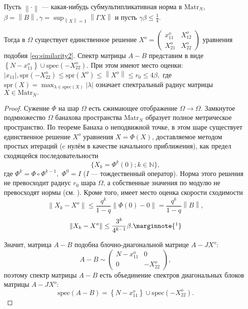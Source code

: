 \begin{lemma}
    Пусть \( {\left\|\cdot\right\|} \) --- какая-нибудь субмультипликативная норма в \( \mathrm{Matr}_{N} \),
    \( \beta={\left\|B\right\|}, \gamma=\sup_{{\left\|X\right\|}=1}{\left\|\Gamma X\right\|} \)
    и пусть
    \( \gamma\beta\leq\frac14. \)

    Тогда в \( \Omega \) существует единственное решение
    \( X^o = \begin{pmatrix}
        x_{11}^o & X_{12}^o \\
        X_{21}^o & X_{22}^o
    \end{pmatrix}\) уравнения подобия
    \eqref{eq:similarity2}.
    Спектр матрицы \( A - B \) представим в виде
    \( \left\{ N - x_{11}^o \right\} \cup \mathrm{spec}\left({-X_{22}^o}\right) \).
    При этом имеют место оценки:
    \( \lvert x_{11} \rvert, \mathrm{spr}\left({-X_{22}^o}\right) \leq \mathrm{spr}\left({X^o}\right)
    \leq {\left\|X^o\right\|} \leq r_0 \leq 4\beta,
        \)
    где \( \mathrm{spr}\left({X}\right)
            = \max_{\lambda\in\mathrm{spec}\left(X\right)}
            \lvert \lambda \rvert \)
    означает спектральный радиус матрицы \( X \in\mathrm{Matr}_{N}. \)
\end{lemma}
\begin{proof}
    Сужение \( \Phi \) на шар \( \Omega \) есть сжимающее отображение \( \Omega\to\Omega \).
    Замкнутое подмножество \( \Omega \)
    банахова пространства \( \mathrm{Matr}_{N} \)
    образует полное метрическое пространство.
    По теореме Банаха о неподвижной точке, в этом шаре существует единственное решение \( X^o \)
    уравнения \( X = \Phi (X) \),
    доставляемое методом простых итераций (c нулём в качестве начального приближения),
    как предел сходящейся последовательности
    \[
        \{X_k = \Phi^k(0); k\in\mathbb{N}\},
        \]
    где \( \Phi^k = \Phi \circ \Phi^{k-1}, \)
    \( \Phi^0 = I \) (\( I \) --- тождественный оператор).
    Норма этого решения не превосходит радиус \( r_0 \) шара \( \Omega \),
    а собственные значения по модулю не превосходят нормы (см. \cite{baskakov-harmonic}).
    Кроме того, имеет место оценка скорости сходимости
    \[
        {\left\|X_k - X^o\right\|} \leq \frac{q^k}{1-q} {\left\|\Phi(0) - 0\right\|} = \frac{q^k}{1-q}{\left\|B\right\|},
        \]
    \[
        {\left\|X_k - X^o\right\|} \leq \frac{3^k}{4^{k-1}}\beta.\marginnote{\footnotemark}
        \]

    Значит, матрица \( A-B \) подобна блочно-диагональной матрице \( A - JX^o \):
    \[
        A-B \sim
    \begin{pmatrix}
        N - x_{11}^o & 0 \\
        0            & -X_{22}^o
    \end{pmatrix},
    \]
    поэтому спектр матрицы \( A - B \) есть объединение спектров
    диагональных блоков матрицы \( A - JX^o \):
    \[ \mathrm{spec}\left({A-B}\right) = \left\{N - x_{11}^o\right\} \cup \mathrm{spec}\left({-X_{22}^o}\right). \]
\end{proof}
